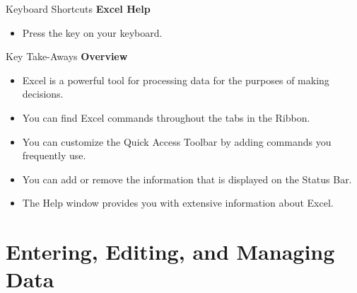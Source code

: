 \begin{center}
	\begin{shtcutbox}{Keyboard Shortcuts}
		\textbf{Excel Help}
		\\
		\begin{itemize}
			\setlength{\itemsep}{0pt}
			\setlength{\parskip}{0pt}
			\setlength{\parsep}{0pt}
			
			\item Press the  key on your keyboard.
			
		\end{itemize}
	\end{shtcutbox}
\end{center}


\begin{center}
	\begin{tkwbox}{Key Take-Aways}
		\textbf{Overview}
		\\
		\begin{itemize}
			\setlength{\itemsep}{0pt}
			\setlength{\parskip}{0pt}
			\setlength{\parsep}{0pt}
			
			\item Excel is a powerful tool for processing data for the purposes of making decisions.
			\item You can find Excel commands throughout the tabs in the Ribbon.
			\item You can customize the Quick Access Toolbar by adding commands you frequently use.
			\item You can add or remove the information that is displayed on the Status Bar.
			\item The Help window provides you with extensive information about Excel.
			
		\end{itemize}
	\end{tkwbox}
\end{center}

\section{Entering, Editing, and Managing Data}

